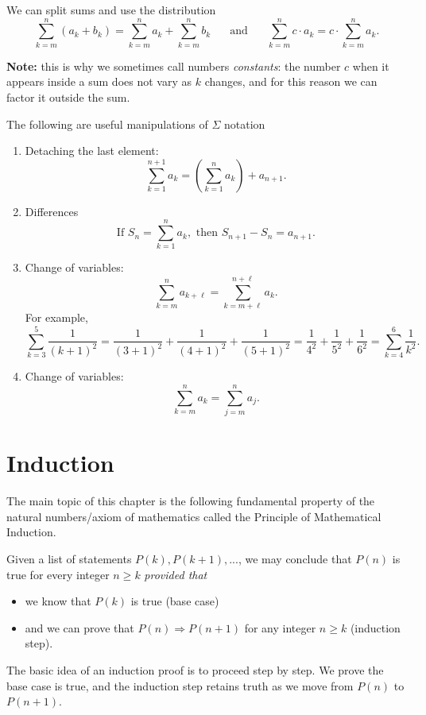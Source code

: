 \documentclass[11pt,dvipsnames]{book}
\numberwithin{figure}{section} %
\numberwithin{table}{section} %
\begin{document}
We can split sums and use the distribution \[\sum_{k=m}^{n} (a_{k} +b_{k})=\sum_{k=m}^{n} a_{k} +\sum_{k=m}^{n} b_{k}\;\; \;\;\; \mbox{ and }\;\;\;\;\; \sum_{k=m}^{n} c\cdot a_{k} =c\cdot \sum_{k=m}^{n} a_{k} .
\]

{\bf Note:} this is why we sometimes call numbers {\it constants}: the number $c$ when it appears inside a sum does not vary as $k$ changes, and for this reason we can factor it outside the sum.

The following are useful manipulations of $\Sigma$ notation
\begin{enumerate}
\item Detaching the last element:
\[ \sum_{k=1}^{n+1} a_k = \left(\sum_{k=1}^{n} a_k\right) + a_{n+1}.\]
\item Differences
\[ \mbox{If } S_n=\sum_{k=1}^{n} a_k, \mbox{ then } S_{n+1}-S_n = a_{n+1}.\]
\item Change of variables:
\[
\sum_{k=m}^{n} a_{k+\ell} =\sum_{k=m+\ell}^{n+\ell} a_{k}.
\]
For example,
\[
\sum_{k=3}^{5} \frac{1}{(k+1)^2}
=\frac{1}{(3+1)^2}+\frac{1}{(4+1)^2}+\frac{1}{(5+1)^2}
=\frac{1}{4^2}+\frac{1}{5^2}+\frac{1}{6^2} = \sum_{k=4}^{6} \frac{1}{k^2}.
\]
\item Change of variables:
\[
\sum_{k=m}^{n} a_{k} =\sum_{j=m}^{n} a_{j}.
\]
\end{enumerate}

\section{Induction}%
\label{inductionsection}

The main topic of this chapter is the following fundamental property of the natural numbers/axiom of mathematics called the Principle of Mathematical Induction.

\begin{definition}
Given a list of statements $P(k),P(k+1),...$, we may conclude that $P(n)$ is true for every integer $n\geqslant k$ {\em provided that}

\begin{itemize}
	\item we know that $P(k)$ is true (base case)
\item and we can prove that $P(n)\Rightarrow P(n+1)$ for any integer $n\geqslant k$ (induction step).
\end{itemize}
\end{definition}

The basic idea of an induction proof is to proceed step by step.
We prove the base case is true, and the induction step retains truth as we move from $P(n)$ to $P(n+1)$.
\end{document}
